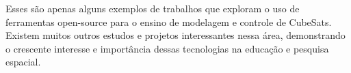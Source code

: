 Esses são apenas alguns exemplos de trabalhos que exploram o uso de ferramentas open-source para o ensino de modelagem e controle de CubeSats. Existem muitos outros estudos e projetos interessantes nessa área, demonstrando o crescente interesse e importância dessas tecnologias na educação e pesquisa espacial.
